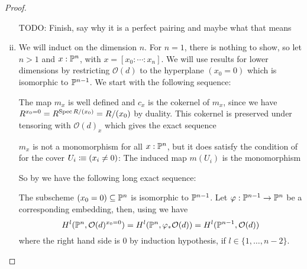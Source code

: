\begin{proof}
\begin{enumerate}[(i)]
    TODO: Finish, say why it is a perfect pairing and maybe what that means
  \item We will induct on the dimension $n$.
    For $n=1$, there is nothing to show, so let $n>1$ and $x:\mathbb{P}^n$, with $x=[x_0:\cdots:x_n]$.
    We will use results for lower dimensions by restricting $\mathcal O(d)$ to the hyperplane $(x_0=0)$ which is isomorphic to $\mathbb{P}^{n-1}$.
    We start with the following sequence:
    \begin{center}
    \end{center}
    The map $m_x$ is well defined and $c_x$ is the cokernel of $m_x$, since we have $R^{x_0=0}=R^{\operatorname{Spec} R/(x_0)}=R/(x_0)$ by duality.
    This cokernel is preserved under tensoring with $\mathcal O(d)_x$ which gives the exact sequence
    \begin{center}
    \end{center}
    
    $m_x$ is not a monomorphism for all $x:\mathbb{P}^n$, but it does satisfy the condition of  for the cover $U_i\vcentcolon\mspace{-1.2mu}\equiv (x_i\neq 0)$:
    The induced map $m(U_i)$ is the monomorphism
    \begin{center}
    \end{center}
    So by  we have the following long exact sequence:
    \begin{center}
    \end{center}
    The subscheme $(x_0=0)\subseteq \mathbb{P}^n$ is isomorphic to $\mathbb{P}^{n-1}$.
    Let $\varphi:\mathbb{P}^{n-1}\to \mathbb{P}^n$ be a corresponding embedding, then, using  we have
    \[
      H^{l}(\mathbb{P}^n,\mathcal O(d)^{x_0=0})=H^l(\mathbb{P}^n,\varphi_\ast\mathcal O(d))=H^l(\mathbb{P}^{n-1},\mathcal O(d))
    \]
    where the right hand side is 0 by induction hypothesis, if $l\in\{1,\dots,n-2\}$.
    

\end{enumerate}
\end{proof}
